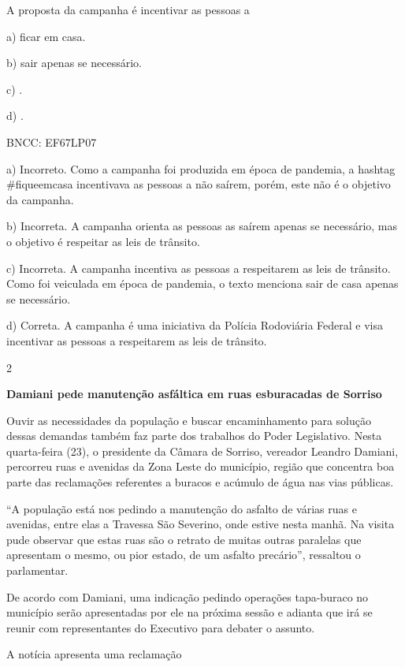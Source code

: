 A proposta da campanha é incentivar as pessoas a

a) ficar em casa.

b) sair apenas se necessário.

c) .

d) .

BNCC: EF67LP07

a) Incorreto. Como a campanha foi produzida em época de pandemia, a
hashtag \#fiqueemcasa incentivava as pessoas a não saírem, porém, este
não é o objetivo da campanha.

b) Incorreta. A campanha orienta as pessoas as saírem apenas se
necessário, mas o objetivo é respeitar as leis de trânsito.

c) Incorreta. A campanha incentiva as pessoas a respeitarem as leis de
trânsito. Como foi veiculada em época de pandemia, o texto menciona sair
de casa apenas se necessário.

d) Correta. A campanha é uma iniciativa da Polícia Rodoviária Federal e
visa incentivar as pessoas a respeitarem as leis de trânsito.

\num{2}

\textbf{Damiani pede manutenção asfáltica em ruas esburacadas de
Sorriso}

Ouvir as necessidades da população e buscar encaminhamento para solução
dessas demandas também faz parte dos trabalhos do Poder Legislativo.
Nesta quarta-feira (23), o presidente da Câmara de Sorriso, vereador
Leandro Damiani, percorreu ruas e avenidas da Zona Leste do município,
região que concentra boa parte das reclamações referentes a buracos e
acúmulo de água nas vias públicas.

``A população está nos pedindo a manutenção do asfalto de várias ruas e
avenidas, entre elas a Travessa São Severino, onde estive nesta manhã.
Na visita pude observar que estas ruas são o retrato de muitas outras
paralelas que apresentam o mesmo, ou pior estado, de um asfalto
precário'', ressaltou o parlamentar.

De acordo com Damiani, uma indicação pedindo operações tapa-buraco no
município serão apresentadas por ele na próxima sessão e adianta que irá
se reunir com representantes do Executivo para debater o assunto.


A notícia apresenta uma reclamação

